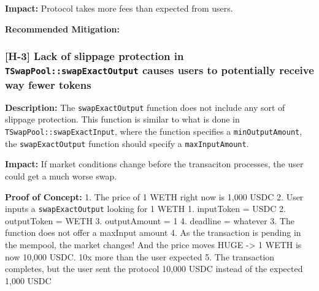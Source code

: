 \textbf{Impact:} Protocol takes more fees than expected from users.

\textbf{Recommended Mitigation:}

\begin{Shaded}
\begin{Highlighting}[]
\NormalTok{    )}
\NormalTok{    \{}
\NormalTok{    \}}
\end{Highlighting}
\end{Shaded}

\subsubsection{\texorpdfstring{{[}H-3{]} Lack of slippage protection in
\texttt{TSwapPool::swapExactOutput} causes users to potentially receive
way fewer
tokens}{{[}H-3{]} Lack of slippage protection in TSwapPool::swapExactOutput causes users to potentially receive way fewer tokens}}\label{h-3-lack-of-slippage-protection-in-tswappoolswapexactoutput-causes-users-to-potentially-receive-way-fewer-tokens}

\textbf{Description:} The \texttt{swapExactOutput} function does not
include any sort of slippage protection. This function is similar to
what is done in \texttt{TSwapPool::swapExactInput}, where the function
specifies a \texttt{minOutputAmount}, the \texttt{swapExactOutput}
function should specify a \texttt{maxInputAmount}.

\textbf{Impact:} If market conditions change before the transaciton
processes, the user could get a much worse swap.

\textbf{Proof of Concept:} 1. The price of 1 WETH right now is 1,000
USDC 2. User inputs a \texttt{swapExactOutput} looking for 1 WETH 1.
inputToken = USDC 2. outputToken = WETH 3. outputAmount = 1 4. deadline
= whatever 3. The function does not offer a maxInput amount 4. As the
transaction is pending in the mempool, the market changes! And the price
moves HUGE -\textgreater{} 1 WETH is now 10,000 USDC. 10x more than the
user expected 5. The transaction completes, but the user sent the
protocol 10,000 USDC instead of the expected 1,000 USDC


